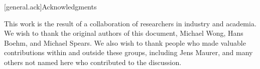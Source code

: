 [general.ack]{Acknowledgments}

This work is the result of a collaboration of researchers in industry and academia. We wish to thank the
original authors of this document, Michael Wong, Hans Boehm, and Michael Spears. We also wish to thank people
who made valuable contributions within and outside these groups, including Jens Maurer, and many others not named
here who contributed to the discussion.




